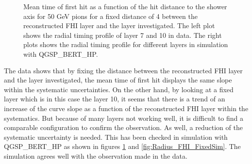 \begin{figure}[htbp!]
\begin{subfigure}[t]{0.5\textwidth}
		\caption{}\label{fig:Radius_FHISim1}
	\end{subfigure}
	\caption{Mean time of first hit as a function of the hit distance to the shower axis for 50 GeV pions for a fixed distance of 4 between the reconstructed FHI layer and the layer investigated. The left plot shows the radial timing profile of layer 7 and 10 in data. The right plots shows the radial timing profile for different layers in simulation with QGSP\_BERT\_HP.}
	\label{fig:Radius_FHIAll}
\end{figure}

The data shows that by fixing the distance between the reconstructed FHI layer and the layer investigated, the mean time of first hit displays the same slope within the systematic uncertainties. On the other hand, by looking at a fixed layer which is in this case the layer 10, it seems that there is a trend of an increase of the curve slope as a function of the reconstructed FHI layer within the systematics. But because of many layers not working well, it is difficult to find a comparable configuration to confirm the observation. As well, a reduction of the systematic uncertainty is needed. This has been checked in simulation with QGSP\_BERT\_HP as shown in figures \ref{fig:Radius_FHISim1} and \ref{fig:Radius_FHI_FixedSim}. The simulation agrees well with the observation made in the data.

